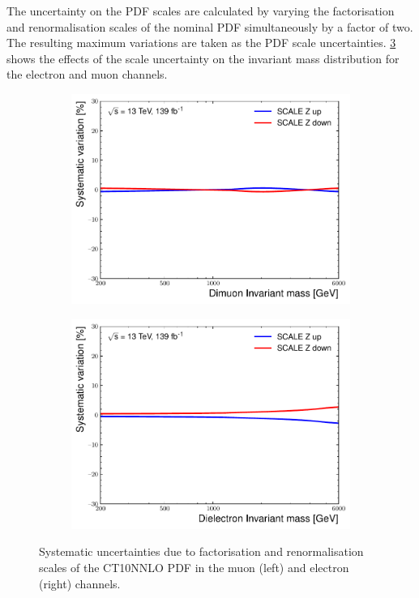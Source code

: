 The uncertainty on the PDF scales are calculated by varying the factorisation and renormalisation scales of the nominal PDF simultaneously by a factor of two. The resulting maximum variations are taken as the PDF scale uncertainties. \cref{fig:uncert:scales} shows the effects of the scale uncertainty on the invariant mass distribution for the electron and muon channels. 
\begin{figure}[h!]
    \centering
    \begin{subfigure}[h]{0.42\textwidth}
        \centering
        \includegraphics[width=\textwidth]{figures/analysis/datamc/Uncertainties/theory/mm/backgroundTemplate_KF_SCALE_Z__1up.pdf}
        \label{fig:uncert:mmscaleZ}
    \end{subfigure}
    \begin{subfigure}[h]{0.42\textwidth}
        \centering
        \includegraphics[width=\textwidth]{figures/analysis/datamc/Uncertainties/theory/ee/backgroundTemplate_KF_SCALE_Z__1up.pdf}
        \label{fig:uncert:eescaleZ}
    \end{subfigure}
    \caption{Systematic uncertainties due to factorisation and renormalisation scales of the CT10NNLO PDF in the muon (left) and electron (right) channels.}
    \label{fig:uncert:scales}
\end{figure}

